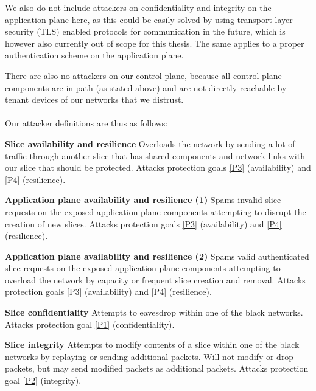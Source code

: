 We also do not include attackers on confidentiality and integrity on the application plane here, as this could be easily solved by using transport layer security (TLS) enabled protocols for communication in the future, which is however also currently out of scope for this thesis. The same applies to a proper authentication scheme on the application plane.

There are also no attackers on our control plane, because all control plane components are in-path (as stated above) and are not directly reachable by tenant devices of our networks that we distrust.

\paragraph{} Our attacker definitions are thus as follows:
\begin{description}[style=multiline, labelwidth=0.7cm]
    \item[\namedlabel{A1}{A1}] \textbf{Slice availability and resilience} Overloads the network by sending a lot of traffic through another slice that has shared components and network links with our slice that should be protected. Attacks protection goals \ref{P3} (availability) and \ref{P4} (resilience).
    \item[\namedlabel{A2}{A2}] \textbf{Application plane availability and resilience (1)} Spams invalid slice requests on the exposed application plane components attempting to disrupt the creation of new slices. Attacks protection goals \ref{P3} (availability) and \ref{P4} (resilience).
    \item[\namedlabel{A3}{A3}] \textbf{Application plane availability and resilience (2)} Spams valid authenticated slice requests on the exposed application plane components attempting to overload the network by capacity or frequent slice creation and removal. Attacks protection goals \ref{P3} (availability) and \ref{P4} (resilience).
    \item[\namedlabel{A4}{A4}] \textbf{Slice confidentiality} Attempts to eavesdrop within one of the black networks. Attacks protection goal \ref{P1} (confidentiality).
    \item[\namedlabel{A5}{A5}] \textbf{Slice integrity} Attempts to modify contents of a slice within one of the black networks by replaying or sending additional packets. Will not modify or drop packets, but may send modified packets as additional packets. Attacks protection goal \ref{P2} (integrity).
\end{description}

